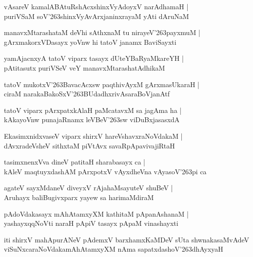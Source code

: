 \begin{shloka}
vAsareV kamalABAtuRshAcxshinxVyAdoyxV narAdhamaH |\\
puriVSaM soV\char'263shinxVyAvArxjaninxrayaM yAti dAruNaM
\end{shloka}

\begin{shloka}
manavxMtarashataM deVhi sAthxnaM tu nirayeV\char'263payxmuM |\\
gArxmakorxVDasayx yoVnw hi tatoV janamx BaviSayxti
\end{shloka}

\begin{shloka}
yamAjacnxyA tatoV viparx tasayx dUteYBaRyaMkareYH |\\
pAtitasutx puriVSeV veY manavxMtarashatAdhikaM
\end{shloka}

\begin{shloka}
tatoV mukotxV\char'263BavacAcxsw paqthivAyxM gArxmasUkaraH |\\
ciraM narakaBakoSxV\char'263BUdadhxrivAsaraBoVjanAtf
\end{shloka}

\begin{shloka}
tatoV viparx pArxpatxkAlaH paMcatavxM sa jagAma ha |\\
kAkayoVnw punajaRnamx leVBeV\char'263sw viDuBxjasasxdA
\end{shloka}

\begin{shloka}
EkasimxnidxvaseV viparx shirxV hareVshavxraNoVdakaM |\\
dAvxradeVsheV sithxtaM piVtAvx savaRpApavivajiRtaH 
\end{shloka}

\begin{shloka}
tasimxnenxVva dineV patitaH sharabasayx ca |\\
kAleV maqtuyxdashAM pArxpotxV vAyxdheVna vAyasoV\char'263pi ca 
\end{shloka}

\begin{shloka}
agateV sayxMdaneV diveyxV rAja{ha}MsayuteV shuBeV |\\
Aruhayx baliBugivxparx yayew sa harimaMdiraM
\end{shloka}

\begin{shloka}
pAdoVdakasayx mAhAtamxyXM kathitaM pApanAshanaM |\\
yashayxqqNoVti naraH pApiV tasayx pApaM vinashayxti
\end{shloka}
iti shirxV mahApurANeV pAdemxV barxhamxKaMDeV sUta shwnakasaMvAdeV viSuNxcaraNoVdakamAhAtamxyXM nAma sapatxdashoV\char'263dhAyxyaH

